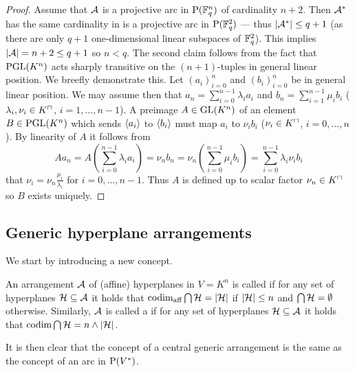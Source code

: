 \begin{proof}
    Assume that $\mathcal{A}$ is a projective arc in $\P(\field{q}^n)$ of cardinality $n+2$. Then $\mathcal{A}^{\ast}$ has the same cardinality in is a projective arc in $\P(\field{q}^2)$ --- thus $\left|\mathcal{A}^{\ast}\right|\leq q+1$ (as there are only $q+1$ one-dimensional linear subspaces of $\mathbb{F}_{q}^2$). This implies $\left|\mathcal{A}\right|=n+2\leq q+1$ so $n<q$.
    The second claim follows from the fact that $\mathrm{PGL}(K^n)$ acts sharply transitive on the $(n+1)$-tuples in general linear position.
    We breefly demonstrate this. Let ${(a_i)}_{i=0}^n$ and ${(b_i)}_{i=0}^n$ be in general linear position. We may assume then that $a_n=\sum_{i=0}^{n-1}{\lambda_i a_i}$ and $b_n=\sum_{i=1}^{n-1}{\mu_i b_i}$ ($\lambda_i,\nu_i\in \units K$, $i=1,\ldots,n-1$).
    A preimage $A\in\mathrm{GL}(K^n)$ of an element $B\in\mathrm{PGL}(K^n)$ which sends $\gen{a_i}$ to $\gen{b_i}$ must map $a_i$ to $\nu_i b_i$ ($\nu_i\in \units K$, $i=0,\ldots,n$). By linearity of $A$ it follows from
    $$
    Aa_n=A\left(\sum_{i=0}^{n-1}{\lambda_i a_i}\right)=\nu_n b_n=\nu_n\left(\sum_{i=0}^{n-1}{\mu_i b_i}\right)=\sum_{i=0}^{n-1}{\lambda_i\nu_i b_i}
    $$
    that $\nu_i=\nu_n\frac{\mu_i}{\lambda_i}$ for $i=0,\ldots,n-1$. Thus $A$ is defined up to scalar factor $\nu_n\in \units K$ so $B$ exists uniquely.
\end{proof}

\subsection{Generic hyperplane arrangements}

We start by introducing a new concept.

\begin{definition}
    An arrangement $\mathcal{A}$ of (affine) hyperplanes in $V=K^n$ is called  if for any set of hyperplanes $\mathcal{H}\subseteq\mathcal{A}$ it holds that $\mathop\mathrm{codim}_{\mathop\mathrm{aff}}{\bigcap\mathcal{H}}=\left|\mathcal{H}\right|$ if $\left|\mathcal{H}\right|\leq n$ and $\bigcap\mathcal{H}=\emptyset$ otherwise.
    Similarly, $\mathcal{A}$ is called a  if for any set of hyperplanes $\mathcal{H}\subseteq\mathcal{A}$ it holds that $\mathop\mathrm{codim}{\bigcap\mathcal{H}}=n\wedge\left|\mathcal{H}\right|$.
\end{definition}

\begin{remark}
    It is then clear that the concept of a central generic arrangement is the same as the concept of an arc in $\mathrm{P}(V^{\ast})$.
\end{remark}

